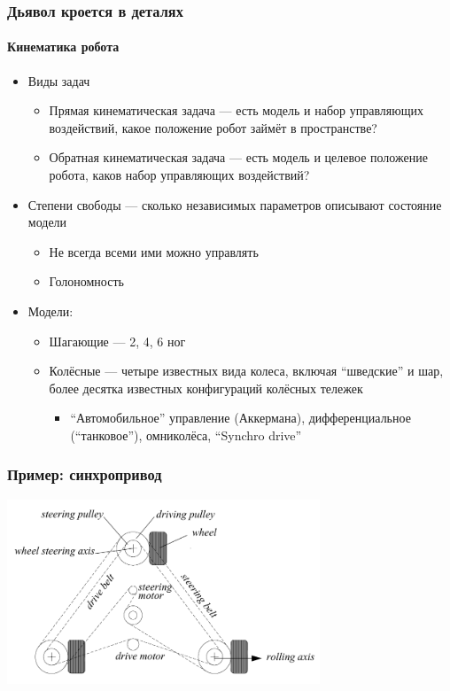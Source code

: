 \documentclass{../../slides-style}
\begin{document}
    \begin{frame}
        \frametitle{Дьявол кроется в деталях}
        \framesubtitle{Кинематика робота}
        \begin{itemize}
            \item Виды задач
            \begin{itemize}
                \item Прямая кинематическая задача --- есть модель и набор управляющих воздействий, какое положение робот займёт в пространстве?
                \item Обратная кинематическая задача --- есть модель и целевое положение робота, каков набор управляющих воздействий?
            \end{itemize}
            \item Степени свободы --- сколько независимых параметров описывают состояние модели
            \begin{itemize}
                \item Не всегда всеми ими можно управлять
                \item Голономность
            \end{itemize}
            \item Модели:
            \begin{itemize}
                \item Шагающие --- 2, 4, 6 ног
                \item Колёсные --- четыре известных вида колеса, включая \enquote{шведские} и шар, более десятка известных конфигураций колёсных тележек
                \begin{itemize}
                    \item \enquote{Автомобильное} управление (Аккермана), дифференциальное (\enquote{танковое}), омниколёса, \enquote{Synchro drive}
                \end{itemize}
            \end{itemize}
        \end{itemize}
    \end{frame}

    \begin{frame}
        \frametitle{Пример: синхропривод}
        \begin{center}
            \includegraphics[width=0.7\textwidth]{synchroDrive.png}
        \end{center}
    \end{frame}
\end{document}
